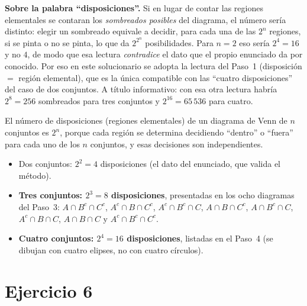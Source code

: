 \documentclass[11pt]{article}
\begin{document}
\begin{nota}
\textbf{Sobre la palabra ``disposiciones''.}
Si en lugar de contar las regiones elementales se contaran los \emph{sombreados posibles} del
diagrama, el número sería distinto: elegir un sombreado equivale a decidir, para cada una de las
$2^{n}$ regiones, si se pinta o no se pinta, lo que da $2^{2^{n}}$ posibilidades. Para $n=2$ eso
sería $2^{4}=16$ y no $4$, de modo que esa lectura \emph{contradice} el dato que el propio
enunciado da por conocido. Por eso en este solucionario se adopta la lectura del Paso~1
(disposición $=$ región elemental), que es la única compatible con las ``cuatro disposiciones''
del caso de dos conjuntos. A título informativo: con esa otra lectura habría $2^{8}=256$
sombreados para tres conjuntos y $2^{16}=65\,536$ para cuatro.
\end{nota}

\begin{resp}
El número de disposiciones (regiones elementales) de un diagrama de Venn de $n$ conjuntos es
$2^{n}$, porque cada región se determina decidiendo ``dentro'' o ``fuera'' para cada uno de los
$n$ conjuntos, y esas decisiones son independientes.
\begin{itemize}[leftmargin=*]
  \item Dos conjuntos: $2^{2}=4$ disposiciones (el dato del enunciado, que valida el método).
  \item \textbf{Tres conjuntos: $2^{3}=8$ disposiciones}, presentadas en los ocho diagramas del
  Paso~3:
  $A\cap B^{c}\cap C^{c}$, $A^{c}\cap B\cap C^{c}$, $A^{c}\cap B^{c}\cap C$,
  $A\cap B\cap C^{c}$, $A\cap B^{c}\cap C$, $A^{c}\cap B\cap C$, $A\cap B\cap C$ y
  $A^{c}\cap B^{c}\cap C^{c}$.
  \item \textbf{Cuatro conjuntos: $2^{4}=16$ disposiciones}, listadas en el Paso~4 (se dibujan
  con cuatro elipses, no con cuatro círculos).
\end{itemize}
\end{resp}

\section*{Ejercicio 6}
\end{document}
